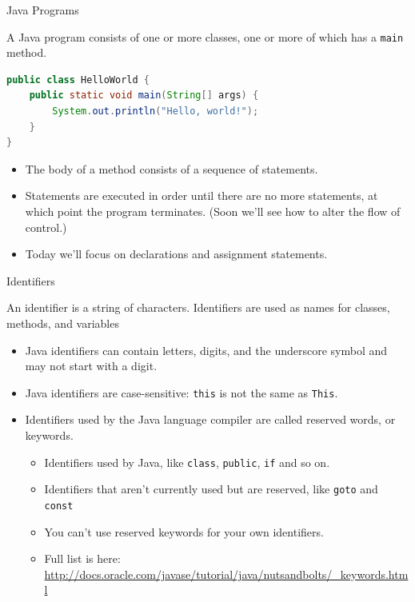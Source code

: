 \documentclass{beamer}
\begin{document}
\begin{frame}[fragile]{Java Programs}


A Java program consists of one or more classes, one or more of which has a {\tt main} method.
\begin{lstlisting}[language=Java]
public class HelloWorld {
    public static void main(String[] args) {
        System.out.println("Hello, world!");
    }
}
\end{lstlisting}
\begin{itemize}
\item The body of a method consists of a sequence of statements.
\item Statements are executed in order until there are no more statements, at which point the program terminates. (Soon we'll see how to alter the flow of control.)
\item Today we'll focus on declarations and assignment statements.
\end{itemize}

\end{frame}


\begin{frame}[fragile]{Identifiers}


An identifier is a string of characters.  Identifiers are used as names for classes, methods, and variables
\begin{itemize}
\item Java identifiers can contain letters, digits, and the underscore symbol and may not start with a digit.
\item Java identifiers are case-sensitive:  {\tt this} is not the same as {\tt This}.
\item Identifiers used by the Java language compiler are called reserved words, or keywords.
\begin{itemize}
\item Identifiers used by Java, like {\tt class}, {\tt public}, {\tt if} and so on.
\item Identifiers that aren't currently used but are reserved, like {\tt goto} and {\tt const}
\item You can't use reserved keywords for your own identifiers.
\item Full list is here: \url{http://docs.oracle.com/javase/tutorial/java/nutsandbolts/_keywords.html}
\end{itemize}

\end{itemize}


\end{frame}
\end{document}
